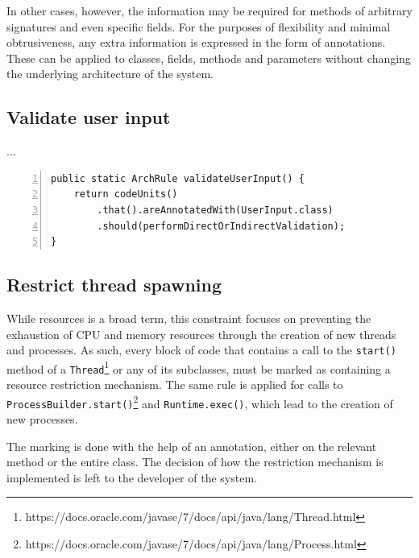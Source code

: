 In other cases, however, the information may be required for methods of arbitrary signatures and even specific fields. For the purposes of flexibility and minimal obtrusiveness, any extra information is expressed in the form of annotations. These can be applied to classes, fields, methods and parameters without changing the underlying architecture of the system.



\subsection{Validate user input}
...

\begin{minipage}{\linewidth}
\begin{lstlisting}[caption={Rule definition for constraint 4.}, captionpos=b, label=lst:constraint_4_impl, numbers=left]
public static ArchRule validateUserInput() {
    return codeUnits()
        .that().areAnnotatedWith(UserInput.class)
        .should(performDirectOrIndirectValidation);
}
\end{lstlisting}
\end{minipage}

\subsection{Restrict thread spawning}
While resources is a broad term, this constraint focuses on preventing the exhaustion of CPU and memory resources through the creation of new threads and processes. As such, every block of code that contains a call to the \texttt{start()} method of a \texttt{Thread}\footnote{https://docs.oracle.com/javase/7/docs/api/java/lang/Thread.html} or any of its subclasses, must be marked as containing a resource restriction mechanism. The same rule is applied for calls to \texttt{ProcessBuilder.start()}\footnote{https://docs.oracle.com/javase/7/docs/api/java/lang/Process.html} and \texttt{Runtime.exec()}\footnotemark[3], which lead to the creation of new processes.

The marking is done with the help of an annotation, either on the relevant method or the entire class. The decision of how the restriction mechanism is implemented is left to the developer of the system.

